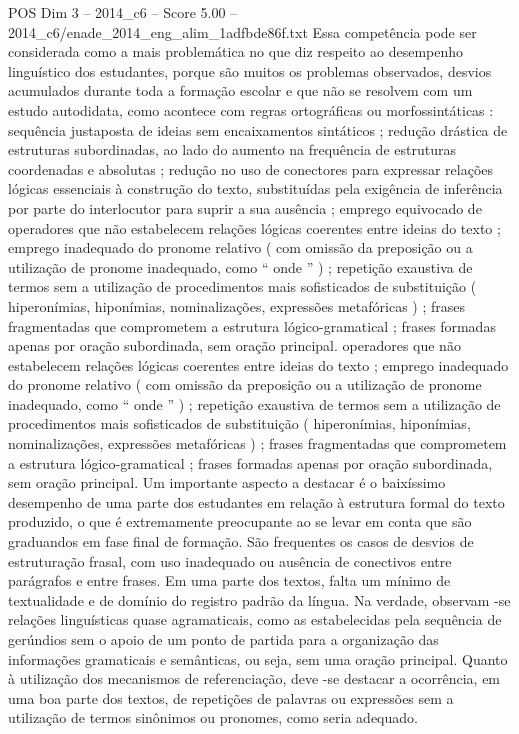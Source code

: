 \begin{textsample}{POS Dim 3 – 2014\_c6 – Score 5.00 – 2014\_c6/enade\_2014\_eng\_alim\_1adfbde86f.txt}
Essa competência pode ser considerada como a mais problemática no que diz respeito ao desempenho linguístico dos estudantes, porque são muitos os problemas observados, desvios acumulados durante toda a formação escolar e que não se resolvem com um estudo autodidata, como acontece com regras ortográficas ou morfossintáticas : sequência justaposta de ideias sem encaixamentos sintáticos ; redução drástica de estruturas subordinadas, ao lado do aumento na frequência de estruturas coordenadas e absolutas ; redução no uso de conectores para expressar relações lógicas essenciais à construção do texto, substituídas pela exigência de inferência por parte do interlocutor para suprir a sua ausência ; emprego equivocado de operadores que não estabelecem relações lógicas coerentes entre ideias do texto ; emprego inadequado do pronome relativo ( com omissão da preposição ou a utilização de pronome inadequado, como “ onde ” ) ; repetição exaustiva de termos sem a utilização de procedimentos mais sofisticados de substituição ( hiperonímias, hiponímias, nominalizações, expressões metafóricas ) ; frases fragmentadas que comprometem a estrutura lógico-gramatical ; frases formadas apenas por oração subordinada, sem oração principal. operadores que não estabelecem relações lógicas coerentes entre ideias do texto ; emprego inadequado do pronome relativo ( com omissão da preposição ou a utilização de pronome inadequado, como “ onde ” ) ; repetição exaustiva de termos sem a utilização de procedimentos mais sofisticados de substituição ( hiperonímias, hiponímias, nominalizações, expressões metafóricas ) ; frases fragmentadas que comprometem a estrutura lógico-gramatical ; frases formadas apenas por oração subordinada, sem oração principal.
Um importante aspecto a destacar é o baixíssimo desempenho de uma parte dos estudantes em relação à estrutura formal do texto produzido, o que é extremamente preocupante ao se levar em conta que são graduandos em fase final de formação.
São frequentes os casos de desvios de estruturação frasal, com uso inadequado ou ausência de conectivos entre parágrafos e entre frases.
Em uma parte dos textos, falta um mínimo de textualidade e de domínio do registro padrão da língua.
Na verdade, observam -se relações linguísticas quase agramaticais, como as estabelecidas pela sequência de gerúndios sem o apoio de um ponto de partida para a organização das informações gramaticais e semânticas, ou seja, sem uma oração principal.
Quanto à utilização dos mecanismos de referenciação, deve -se destacar a ocorrência, em uma boa parte dos textos, de repetições de palavras ou expressões sem a utilização de termos sinônimos ou pronomes, como seria adequado.

\end{textsample}
